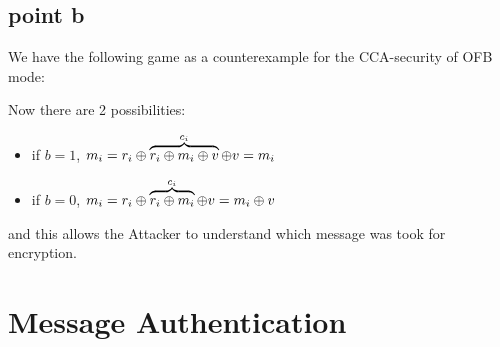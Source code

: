 \documentclass[11pt]{article}
\newcounter{t0d0_counter}
\begin{document}
\subsection{point b}

We have the following game as a counterexample for the CCA-security of OFB mode:


\begin{figure}[h!]
   \centering
   \sdinit{}
\end{figure}
Now there are 2 possibilities:
\begin{itemize}
    \item if $b=1$, $m_{i}= r_{i} \oplus \overbrace{r_{i} \oplus m_{i} \oplus
        v}^{c_{i}} \oplus v=m_{i}$
    \item if $b=0$, $m_{i}= r_{i} \oplus \overbrace{r_{i} \oplus m_{i}}^{c_{i}}
        \oplus v = m_{i} \oplus v$
\end{itemize}
and this allows the Attacker to understand which message was took for
encryption.
\newpage
\section{Message Authentication}
\end{document}
